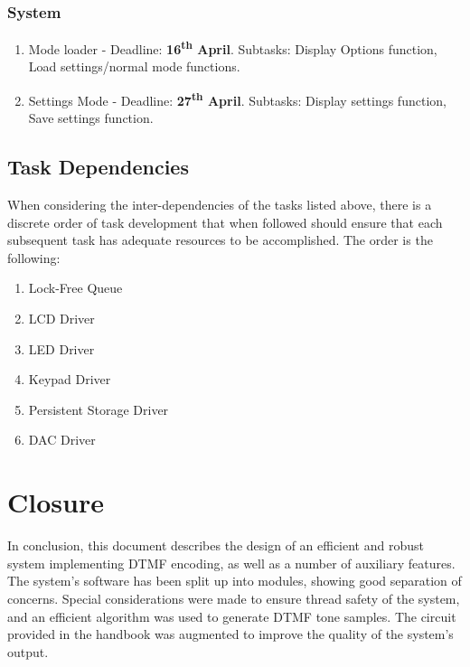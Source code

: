 \documentclass[11pt,a4paper,twocolumn]{scrartcl}
\begin{document}
\subsubsection{System}
\begin{enumerate}
    \item Mode loader - Deadline: \textbf{16\textsuperscript{th} April}. Subtasks: Display Options function, Load settings/normal mode functions.
    \item Settings Mode - Deadline: \textbf{27\textsuperscript{th} April}. Subtasks: Display settings function, Save settings function.
\end{enumerate}

\subsection{Task Dependencies}
When considering the inter-dependencies of the tasks listed above, there is a discrete order of task development that when followed should ensure that each subsequent task has adequate resources to be accomplished. The order is the following:
\begin{enumerate}
    \item Lock-Free Queue
    \item LCD Driver
   \item LED Driver
   \item Keypad Driver
   \item Persistent Storage Driver
   \item DAC Driver
\end{enumerate}

\section{Closure}

In conclusion, this document describes the design of an efficient and robust system implementing DTMF encoding, as well as a number of auxiliary features. The system's software has been split up
into modules, showing good separation of concerns. Special considerations were made to ensure thread safety of the system, and an efficient algorithm was used to generate DTMF tone samples. The circuit provided in the handbook was augmented to improve the quality of the system's output. 



\end{document}
